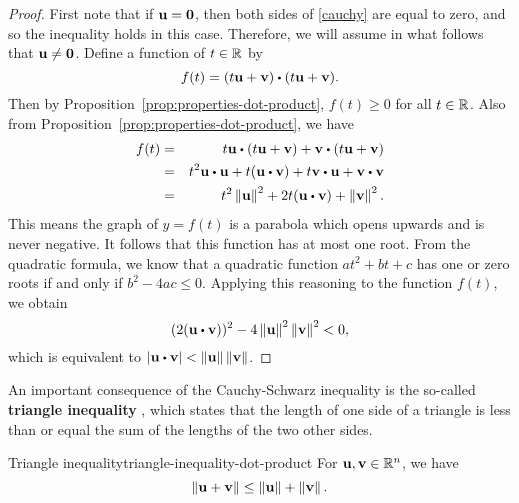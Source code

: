 \begin{proof}
  First note that if $\vect{u}=\vect{0}$, then both sides of
  \eqref{cauchy} are equal to zero, and so the inequality holds in
  this case. Therefore, we will assume in what follows that
  $\vect{u}\neq \vect{0}$.  Define a function of $t\in \mathbb{R}$ by
  \begin{equation*}
    f(t) =(t\vect{u}+\vect{v}) \dotprod (t\vect{u}+ \vect{v}).
  \end{equation*}
  Then by Proposition~\ref{prop:properties-dot-product}, $f(t) \geq 0$
  for all $t\in \mathbb{R}$.  Also from
  Proposition~\ref{prop:properties-dot-product}, we have
  \begin{eqnarray*}
    f(t) &=&t\vect{u}\dotprod (t\vect{u}+\vect{v}) +
             \vect{v}\dotprod (t\vect{u}+\vect{v}) \\
         &=&t^2\vect{u}\dotprod \vect{u}+t(\vect{u}\dotprod \vect{v}) + t \vect{v}\dotprod \vect{u}+
             \vect{v}\dotprod \vect{v} \\
         &=&t^2\norm{\vect{u}}^{2}+2t(\vect{u}\dotprod \vect{v}) +\norm{
             \vect{v}} ^{2}.
  \end{eqnarray*}
  This means the graph of $y=f(t)$ is a parabola which opens upwards
  and is never negative. It follows that this function has at most one
  root. From the quadratic formula, we know that a quadratic function
  $at^2+bt+c$ has one or zero roots if and only if $b^2-4ac\leq
  0$. Applying this reasoning to the function $f(t)$, we obtain
  \begin{equation*}
    (2(\vect{u}\dotprod \vect{v})) ^{2}-4\norm{\vect{u}
    } ^{2}\norm{\vect{v}} ^{2}<0,
  \end{equation*}
  which is equivalent to
  $\abs{\vect{u}\dotprod \vect{v} }<\norm{\vect{u}} \norm{\vect{v}}$.
\end{proof}

An important consequence of the Cauchy-Schwarz inequality is the
so-called \textbf{triangle inequality}%
, which states that the length
of one side of a triangle is less than or equal the sum of the lengths
of the two other sides.

\begin{proposition}{Triangle inequality}{triangle-inequality-dot-product}
  For\/ $\vect{u},\vect{v}\in \R^{n}$, we have
  \begin{equation}\label{triangle-ineq-1}
    \norm{\vect{u}+\vect{v}} \leq \norm{\vect{u}} +\norm{\vect{v}}.
  \end{equation}

  \begin{center}
  \end{center}
\end{proposition}

